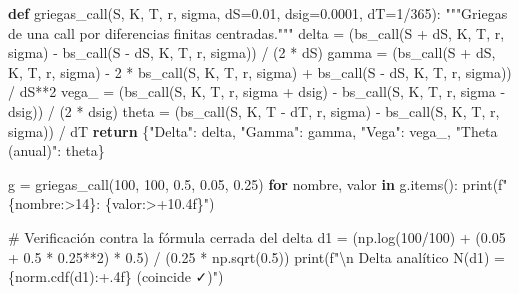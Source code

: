 \documentclass[
  spanish,
  letterpaper,
  DIV=11,
  numbers=noendperiod]{scrreprt}
\newenvironment{Shaded}{\begin{snugshade}}{\end{snugshade}}
\newcommand{\BuiltInTok}[1]{\textcolor[rgb]{0.00,0.23,0.31}{#1}}
\newcommand{\CharTok}[1]{\textcolor[rgb]{0.13,0.47,0.30}{#1}}
\newcommand{\CommentTok}[1]{\textcolor[rgb]{0.37,0.37,0.37}{#1}}
\newcommand{\ControlFlowTok}[1]{\textcolor[rgb]{0.00,0.23,0.31}{\textbf{#1}}}
\newcommand{\DecValTok}[1]{\textcolor[rgb]{0.68,0.00,0.00}{#1}}
\newcommand{\FloatTok}[1]{\textcolor[rgb]{0.68,0.00,0.00}{#1}}
\newcommand{\KeywordTok}[1]{\textcolor[rgb]{0.00,0.23,0.31}{\textbf{#1}}}
\newcommand{\NormalTok}[1]{\textcolor[rgb]{0.00,0.23,0.31}{#1}}
\newcommand{\OperatorTok}[1]{\textcolor[rgb]{0.37,0.37,0.37}{#1}}
\newcommand{\SpecialCharTok}[1]{\textcolor[rgb]{0.37,0.37,0.37}{#1}}
\newcommand{\SpecialStringTok}[1]{\textcolor[rgb]{0.13,0.47,0.30}{#1}}
\newcommand{\StringTok}[1]{\textcolor[rgb]{0.13,0.47,0.30}{#1}}
\begin{document}
\label{griegas}
\begin{Shaded}
\begin{Highlighting}[]
\KeywordTok{def}\NormalTok{ griegas\_call(S, K, T, r, sigma, dS}\OperatorTok{=}\FloatTok{0.01}\NormalTok{, dsig}\OperatorTok{=}\FloatTok{0.0001}\NormalTok{, dT}\OperatorTok{=}\DecValTok{1}\OperatorTok{/}\DecValTok{365}\NormalTok{):}
    \CommentTok{"""Griegas de una call por diferencias finitas centradas."""}
\NormalTok{    delta }\OperatorTok{=}\NormalTok{ (bs\_call(S }\OperatorTok{+}\NormalTok{ dS, K, T, r, sigma) }\OperatorTok{{-}}\NormalTok{ bs\_call(S }\OperatorTok{{-}}\NormalTok{ dS, K, T, r, sigma)) }\OperatorTok{/}\NormalTok{ (}\DecValTok{2} \OperatorTok{*}\NormalTok{ dS)}
\NormalTok{    gamma }\OperatorTok{=}\NormalTok{ (bs\_call(S }\OperatorTok{+}\NormalTok{ dS, K, T, r, sigma) }\OperatorTok{{-}} \DecValTok{2} \OperatorTok{*}\NormalTok{ bs\_call(S, K, T, r, sigma)}
             \OperatorTok{+}\NormalTok{ bs\_call(S }\OperatorTok{{-}}\NormalTok{ dS, K, T, r, sigma)) }\OperatorTok{/}\NormalTok{ dS}\OperatorTok{**}\DecValTok{2}
\NormalTok{    vega\_ }\OperatorTok{=}\NormalTok{ (bs\_call(S, K, T, r, sigma }\OperatorTok{+}\NormalTok{ dsig) }\OperatorTok{{-}}\NormalTok{ bs\_call(S, K, T, r, sigma }\OperatorTok{{-}}\NormalTok{ dsig)) }\OperatorTok{/}\NormalTok{ (}\DecValTok{2} \OperatorTok{*}\NormalTok{ dsig)}
\NormalTok{    theta }\OperatorTok{=}\NormalTok{ (bs\_call(S, K, T }\OperatorTok{{-}}\NormalTok{ dT, r, sigma) }\OperatorTok{{-}}\NormalTok{ bs\_call(S, K, T, r, sigma)) }\OperatorTok{/}\NormalTok{ dT}
    \ControlFlowTok{return}\NormalTok{ \{}\StringTok{"Delta"}\NormalTok{: delta, }\StringTok{"Gamma"}\NormalTok{: gamma, }\StringTok{"Vega"}\NormalTok{: vega\_, }\StringTok{"Theta (anual)"}\NormalTok{: theta\}}

\NormalTok{g }\OperatorTok{=}\NormalTok{ griegas\_call(}\DecValTok{100}\NormalTok{, }\DecValTok{100}\NormalTok{, }\FloatTok{0.5}\NormalTok{, }\FloatTok{0.05}\NormalTok{, }\FloatTok{0.25}\NormalTok{)}
\ControlFlowTok{for}\NormalTok{ nombre, valor }\KeywordTok{in}\NormalTok{ g.items():}
    \BuiltInTok{print}\NormalTok{(}\SpecialStringTok{f"  }\SpecialCharTok{\{}\NormalTok{nombre}\SpecialCharTok{:\textgreater{}14\}}\SpecialStringTok{: }\SpecialCharTok{\{}\NormalTok{valor}\SpecialCharTok{:\textgreater{}+10.4f\}}\SpecialStringTok{"}\NormalTok{)}

\CommentTok{\# Verificación contra la fórmula cerrada del delta}
\NormalTok{d1 }\OperatorTok{=}\NormalTok{ (np.log(}\DecValTok{100}\OperatorTok{/}\DecValTok{100}\NormalTok{) }\OperatorTok{+}\NormalTok{ (}\FloatTok{0.05} \OperatorTok{+} \FloatTok{0.5} \OperatorTok{*} \FloatTok{0.25}\OperatorTok{**}\DecValTok{2}\NormalTok{) }\OperatorTok{*} \FloatTok{0.5}\NormalTok{) }\OperatorTok{/}\NormalTok{ (}\FloatTok{0.25} \OperatorTok{*}\NormalTok{ np.sqrt(}\FloatTok{0.5}\NormalTok{))}
\BuiltInTok{print}\NormalTok{(}\SpecialStringTok{f"}\CharTok{\textbackslash{}n}\SpecialStringTok{  Delta analítico N(d1) = }\SpecialCharTok{\{}\NormalTok{norm}\SpecialCharTok{.}\NormalTok{cdf(d1)}\SpecialCharTok{:+.4f\}}\SpecialStringTok{  (coincide ✓)"}\NormalTok{)}
\end{Highlighting}
\end{Shaded}
\end{document}
